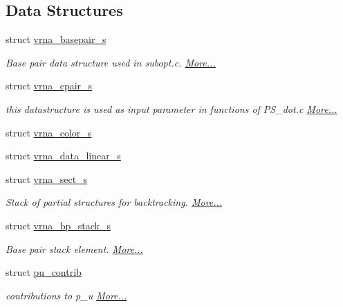 \subsection*{Data Structures}
\begin{DoxyCompactItemize}
\item 
struct \hyperlink{group__data__structures_structvrna__basepair__s}{vrna\+\_\+basepair\+\_\+s}
\begin{DoxyCompactList}\small\item\em Base pair data structure used in subopt.\+c.  \hyperlink{group__data__structures_structvrna__basepair__s}{More...}\end{DoxyCompactList}\item 
struct \hyperlink{group__data__structures_structvrna__cpair__s}{vrna\+\_\+cpair\+\_\+s}
\begin{DoxyCompactList}\small\item\em this datastructure is used as input parameter in functions of P\+S\+\_\+dot.\+c  \hyperlink{group__data__structures_structvrna__cpair__s}{More...}\end{DoxyCompactList}\item 
struct \hyperlink{group__data__structures_structvrna__color__s}{vrna\+\_\+color\+\_\+s}
\item 
struct \hyperlink{group__data__structures_structvrna__data__linear__s}{vrna\+\_\+data\+\_\+linear\+\_\+s}
\item 
struct \hyperlink{group__data__structures_structvrna__sect__s}{vrna\+\_\+sect\+\_\+s}
\begin{DoxyCompactList}\small\item\em Stack of partial structures for backtracking.  \hyperlink{group__data__structures_structvrna__sect__s}{More...}\end{DoxyCompactList}\item 
struct \hyperlink{group__data__structures_structvrna__bp__stack__s}{vrna\+\_\+bp\+\_\+stack\+\_\+s}
\begin{DoxyCompactList}\small\item\em Base pair stack element.  \hyperlink{group__data__structures_structvrna__bp__stack__s}{More...}\end{DoxyCompactList}\item 
struct \hyperlink{group__data__structures_structpu__contrib}{pu\+\_\+contrib}
\begin{DoxyCompactList}\small\item\em contributions to p\+\_\+u  \hyperlink{group__data__structures_structpu__contrib}{More...}\end{DoxyCompactList}\item 

\end{DoxyCompactItemize}
